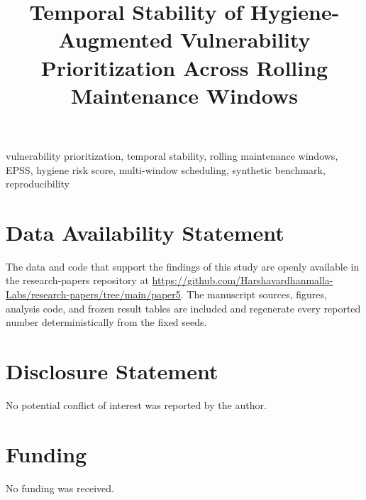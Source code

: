 \documentclass[journal]{IEEEtran}
\title{Temporal Stability of Hygiene-Augmented Vulnerability
Prioritization Across Rolling Maintenance Windows}
\author{%
  \IEEEauthorblockN{Harshavardhan Malla}
  \IEEEauthorblockA{Independent Researcher\\
  Email: harshavardhanmalla75@gmail.com}%
}
\begin{document}
\maketitle

\begin{abstract}

\end{abstract}

\begin{IEEEkeywords}
vulnerability prioritization, temporal stability, rolling maintenance
windows, EPSS, hygiene risk score, multi-window scheduling,
synthetic benchmark, reproducibility
\end{IEEEkeywords}














\section*{Data Availability Statement}
The data and code that support the findings of this study are openly available in the research-papers repository at \url{https://github.com/Harshavardhanmalla-Labs/research-papers/tree/main/paper5}. The manuscript sources, figures, analysis code, and frozen result tables are included and regenerate every reported number deterministically from the fixed seeds.

\section*{Disclosure Statement}
No potential conflict of interest was reported by the author.

\section*{Funding}
No funding was received.
\end{document}
